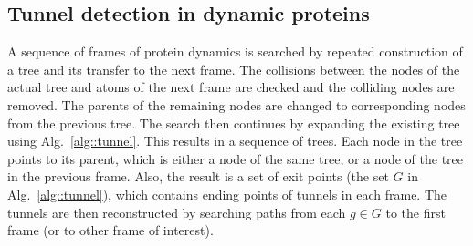 \documentclass{llncs}
\def\qnear{q_{near}}
\def\qnew{q_{new}}
\def\T{\mathcal{T}}
\def\probe{r_{\mathrm{probe}}}
\def\SS{\mathbf{S}}
\begin{document}
%

\subsection{Tunnel detection in dynamic proteins}

A sequence of frames of protein dynamics is searched by repeated construction of a tree and its transfer to the next frame.
The collisions between the nodes of the actual tree and atoms of the next frame are checked and the colliding nodes are removed.
The parents of the remaining nodes are changed to corresponding nodes from the previous tree.
The search then continues by expanding the existing tree using Alg.~\ref{alg::tunnel}.
This results in a sequence of trees.
Each node in the tree points to its parent, which is either a node of the same tree, or a node of the tree in the previous frame.
Also, the result is a set of exit points (the set $G$ in Alg.~\ref{alg::tunnel}), which contains ending points of tunnels in each frame. 
The tunnels are then reconstructed by searching paths from each $g \in G$ to the first frame (or to other frame of interest).
\end{document}
